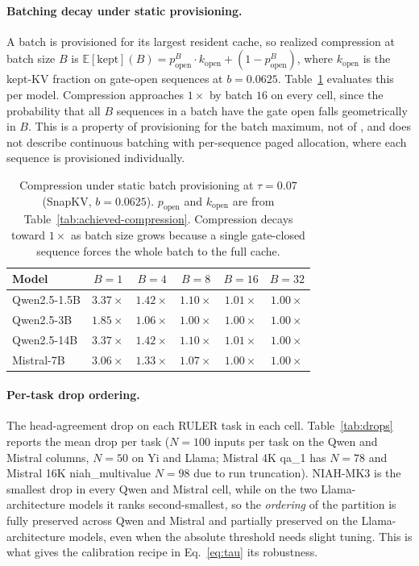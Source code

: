 \paragraph{Batching decay under static provisioning.}
A batch is provisioned for its largest resident cache, so realized
compression at batch size $B$ is $\mathbb{E}[\text{kept}](B) =
p_{\text{open}}^{B} \cdot k_{\text{open}} + (1 - p_{\text{open}}^{B})$,
where $k_{\text{open}}$ is the kept-KV fraction on gate-open sequences at
$b = 0.0625$. Table~\ref{tab:batching-decay} evaluates this per model.
Compression approaches $1\times$ by batch $16$ on every cell, since the
probability that all $B$ sequences in a batch have the gate open falls
geometrically in $B$. This is a property of provisioning for the batch
maximum, not of \method, and does not describe continuous batching with
per-sequence paged allocation, where each sequence is provisioned
individually.

\begin{table}[t]
\centering
\caption{Compression under static batch provisioning at $\tau = 0.07$
(SnapKV, $b = 0.0625$). $p_{\text{open}}$ and $k_{\text{open}}$ are from
Table~\ref{tab:achieved-compression}. Compression decays toward $1\times$
as batch size grows because a single gate-closed sequence forces the
whole batch to the full cache.}
\label{tab:batching-decay}
\begin{tabular}{lccccc}
\toprule
Model & $B{=}1$ & $B{=}4$ & $B{=}8$ & $B{=}16$ & $B{=}32$ \\
\midrule
Qwen2.5-1.5B & $3.37\times$ & $1.42\times$ & $1.10\times$ & $1.01\times$ & $1.00\times$ \\
Qwen2.5-3B   & $1.85\times$ & $1.06\times$ & $1.00\times$ & $1.00\times$ & $1.00\times$ \\
Qwen2.5-14B  & $3.37\times$ & $1.42\times$ & $1.10\times$ & $1.01\times$ & $1.00\times$ \\
Mistral-7B   & $3.06\times$ & $1.33\times$ & $1.07\times$ & $1.00\times$ & $1.00\times$ \\
\bottomrule
\end{tabular}
\end{table}

\paragraph{Per-task drop ordering.}
\label{subsec:drops-ordering}
The head-agreement drop on each RULER task in each cell.
Table~\ref{tab:drops} reports the mean drop per task ($N = 100$ inputs
per task on the Qwen and Mistral columns, $N = 50$ on Yi and Llama;
Mistral 4K qa\_1 has $N = 78$ and Mistral 16K niah\_multivalue $N = 98$
due to run truncation). NIAH-MK3 is the smallest drop in every Qwen and
Mistral cell, while on the two Llama-architecture models it ranks second-smallest,
so the \emph{ordering} of the partition is fully preserved across Qwen
and Mistral and partially preserved on the Llama-architecture models, even when the
absolute threshold needs slight tuning. This is
what gives the calibration recipe in Eq.~\eqref{eq:tau} its robustness.

